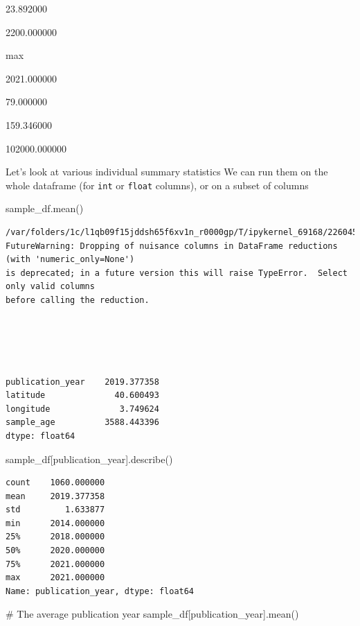\documentclass[
  letterpaper,
]{book}
\newenvironment{Shaded}{}{}
\newcommand{\CommentTok}[1]{\textcolor[rgb]{0.42,0.45,0.49}{#1}}
\newcommand{\NormalTok}[1]{\textcolor[rgb]{0.14,0.16,0.18}{#1}}
\newcommand{\StringTok}[1]{\textcolor[rgb]{0.01,0.18,0.38}{#1}}
\begin{document}
23.892000

2200.000000

max

2021.000000

79.000000

159.346000

102000.000000

Let's look at various individual summary statistics We can run them on
the whole dataframe (for \texttt{int} or \texttt{float} columns), or on
a subset of columns

\begin{Shaded}
\begin{Highlighting}[]
\NormalTok{sample\_df.mean()}
\end{Highlighting}
\end{Shaded}

\begin{verbatim}
/var/folders/1c/l1qb09f15jddsh65f6xv1n_r0000gp/T/ipykernel_69168/2260452167.py:1:
FutureWarning: Dropping of nuisance columns in DataFrame reductions (with 'numeric_only=None')
is deprecated; in a future version this will raise TypeError.  Select only valid columns
before calling the reduction.





publication_year    2019.377358
latitude              40.600493
longitude              3.749624
sample_age          3588.443396
dtype: float64
\end{verbatim}

\begin{Shaded}
\begin{Highlighting}[]
\NormalTok{sample\_df[}\StringTok{\textquotesingle{}publication\_year\textquotesingle{}}\NormalTok{].describe()}
\end{Highlighting}
\end{Shaded}

\begin{verbatim}
count    1060.000000
mean     2019.377358
std         1.633877
min      2014.000000
25%      2018.000000
50%      2020.000000
75%      2021.000000
max      2021.000000
Name: publication_year, dtype: float64
\end{verbatim}

\begin{Shaded}
\begin{Highlighting}[]
\CommentTok{\# The average publication year}
\NormalTok{sample\_df[}\StringTok{\textquotesingle{}publication\_year\textquotesingle{}}\NormalTok{].mean()}
\end{Highlighting}
\end{Shaded}
\end{document}
